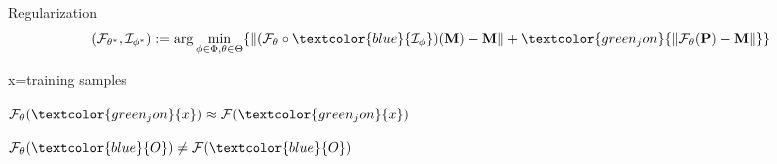 \begin{frame}{Regularization}
\begin{equation}
\begin{aligned}
	(\mathcal{F}_{\theta^\ast}, \mathcal{I}_{\phi^\ast}):=\arg \min_{\phi \in \Phi, \theta \in \Theta} \{ & \|(\mathcal{F}_{\theta} \circ \textcolor{blue}{\mathcal{I}_{\phi}})(\mathbf{M})-\mathbf{M}\| + \textcolor{green_jon}{\|{\cal F}_{\theta}({\bf P})-{\bf M}\|} \}
\end{aligned}
\notag
\end{equation}

\begin{figure}[!h]
	\centering
	
	\label{fig:regu}
\end{figure}

\center
\textcolor{green_jon}{x}=training samples

${\cal F}_\theta(\textcolor{green_jon}{x}) \approx {\cal F}(\textcolor{green_jon}{x})$

${\cal F}_\theta(\textcolor{blue}{O}) \neq {\cal F}(\textcolor{blue}{O})$
\end{frame}


